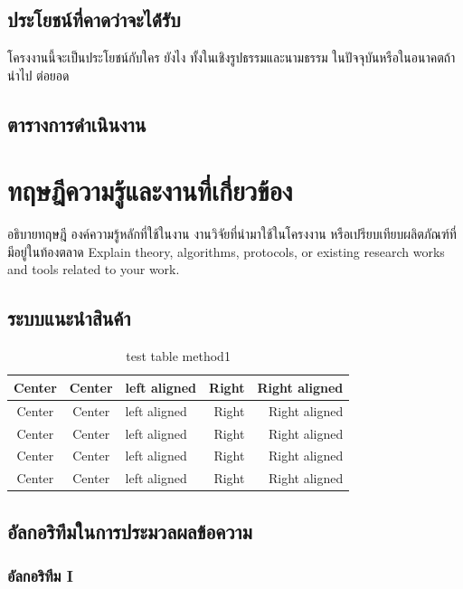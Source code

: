 \documentclass[12pt,oneside,openright,a4paper]{cpe-thai-project}
\begin{document}
\section{ประโยชน์ที่คาดว่าจะได้่รับ}

โครงงานนี้จะเป็นประโยชน์กับใคร ยังไง ทั้งในเชิงรูปธรรมและนามธรรม ในปัจจุบันหรือในอนาคตถ้านำไป
ต่อยอด

\section{ตารางการดำเนินงาน}

\chapter{ทฤษฎีความรู้และงานที่เกี่ยวข้อง}

อธิบายทฤษฎี องค์ความรู้หลักที่ใช้ในงาน งานวิจัยที่นำมาใช้ในโครงงาน หรือเปรียบเทียบผลิตภัณฑ์ที่มีอยู่ในท้องตลาด
Explain theory, algorithms, protocols, or existing research works and tools related to your work. 

\section{ระบบแนะนำสินค้า}

\begin{table}[!h]
\caption{test table method1}\label{tbl:method1}
\begin{tabular}{c|c|l|rr} \hline\hline
Center & Center & left aligned & Right & Right aligned \\ \hline\hline
Center & Center & left aligned & Right & Right aligned \\ \hline
Center & Center & left aligned & Right & Right aligned \\ 
Center & Center & left aligned & Right & Right aligned \\ \hline
Center & Center & left aligned & Right & Right aligned \\ \hline\hline
\end{tabular}
\end{table}


\section{อัลกอริทึมในการประมวลผลข้อความ}
\subsection{อัลกอริทึม I}
\end{document}
